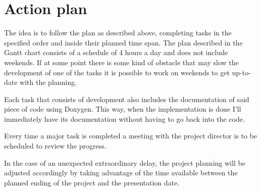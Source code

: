 \section{Action plan}

The idea is to follow the plan as described above, completing tasks in the specified 
order and inside their planned time span.
The plan described in the Gantt chart consists of a schedule of 4 hours a day and 
does not include weekends. If at some point there is some kind of obstacle that may 
slow the development of one of the tasks it is possible to work on weekends to get 
up-to-date with the planning.

Each task that consists of development also includes the documentation of said piece 
of code using Doxygen. This way, when the implementation is done I'll immediately 
have its documentation without having to go back into the code.

Every time a major task is completed a meeting with the project director is to be 
scheduled to review the progress.

In the case of an unexpected extraordinary delay, the project planning will be adjusted 
accordingly by taking advantage of the time available between the planned ending of 
the project and the presentation date.

